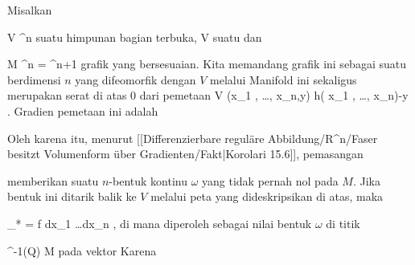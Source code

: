 {

Misalkan

\mavergleichskette
{\vergleichskette
{ V
}
{ \subseteq }{ \R^n
}
{  }{
}
{    }{
}
{   }{
}
}
{}{}{}
suatu himpunan bagian terbuka,
 { V } {\R
} {}
suatu
dan

\mavergleichskette
{\vergleichskette
{M
}
{ \subset }{ \R^n \times \R
}
{ = }{\R^{n+1}
}
{    }{
}
{   }{
}
}
{}{}{}
grafik yang bersesuaian. Kita memandang grafik ini sebagai suatu
berdimensi $n$ yang difeomorfik dengan $V$ melalui
Manifold ini sekaligus merupakan serat di atas $0$ dari pemetaan
\maabbeledisp {\varphi} {V \times \R} {\R
} {(x_1 , \ldots , x_n,y)} { h( x_1 , \ldots , x_n)-y
} {.}
Gradien pemetaan ini adalah

 {  }

Oleh karena itu, menurut
[[Differenzierbare reguläre Abbildung/R^n/Faser besitzt Volumenform über Gradienten/Fakt|Korolari 15.6]],
pemasangan

 {  }

memberikan suatu $n$-bentuk kontinu $\omega$ yang tidak pernah nol pada $M$. Jika bentuk ini ditarik balik ke $V$ melalui peta
 {} {}
yang dideskripsikan di atas, maka

\mavergleichskette
{\vergleichskette
{ \alpha_*\omega
}
{ = }{ f dx_1 \wedge \ldots \wedge dx_n
}
{  }{
}
{    }{
}
{   }{
}
}
{}{}{,}
di mana
 diperoleh sebagai nilai bentuk $\omega$ di titik

\mavergleichskette
{\vergleichskette
{ \alpha^{-1}(Q)
}
{ \in }{ M
}
{  }{
}
{    }{
}
{   }{
}
}
{}{}{}
pada vektor
Karena

}
